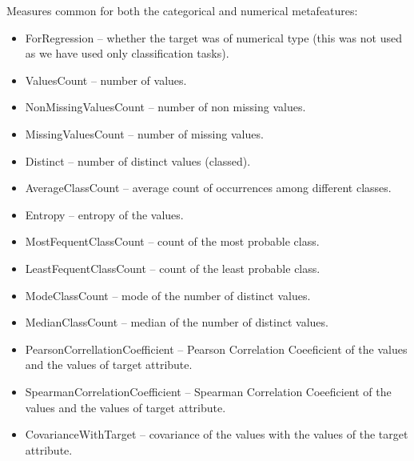 Measures common for both the categorical and numerical metafeatures:
\begin{itemize}	
	\item ForRegression -- whether the target was of numerical type (this was not used as we have used only classification tasks).
	\item ValuesCount -- number of values.
	\item NonMissingValuesCount -- number of non missing values.
	\item MissingValuesCount -- number of missing values.
	\item Distinct -- number of distinct values (classed).
	\item AverageClassCount  -- average count of occurrences among different classes.
	\item Entropy -- entropy of the values.
	\item MostFequentClassCount -- count of the most probable class.
	\item LeastFequentClassCount  -- count of the least probable class.
	\item ModeClassCount -- mode of the number of distinct values.
	\item MedianClassCount -- median of the number of distinct values.
	\item PearsonCorrellationCoefficient -- Pearson Correlation Coeeficient of the values and the values of target attribute.
	\item SpearmanCorrelationCoefficient -- Spearman Correlation Coeeficient of the values and the values of target attribute.
	\item CovarianceWithTarget -- covariance of the values with the values of the target attribute.
\end{itemize}

